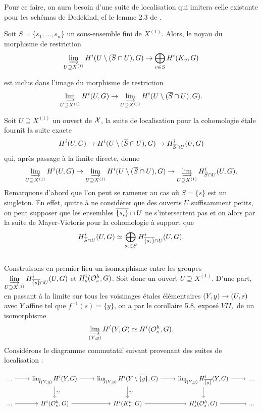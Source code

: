 \documentclass[11pt]{article}
\begin{document}
Pour ce faire, on aura besoin d'une suite de localisation qui imitera celle existante pour les schémas de Dedekind, cf le lemme 2.3 de \cite{HarSza}.

\lemme\label{lemlocalisation} Soit $S=\{s_1,...,s_n\}$ un sous-ensemble fini de $X^{(1)}$. Alors, le noyau du morphisme de restriction
$$
\varinjlim_{U \supseteq X^{(1)}} H^i(U\setminus (\overline{S} \cap U),G) \rightarrow \bigoplus_{v \in S} H^i(K_v,G)
$$

est inclus dans l'image du morphisme de restriction
$$
\varinjlim_{U \supseteq X^{(1)}} H^i(U,G) \rightarrow \varinjlim_{U \supseteq X^{(1)}} H^i(U\setminus (\overline{S} \cap U),G).
$$

\proof Soit $U \supseteq X^{(1)}$ un ouvert de $\mathcal{X}$, la suite de localisation pour la cohomologie étale fournit la suite exacte
$$
H^i(U,G) \rightarrow H^i(U\setminus (\overline{S} \cap U),G) \rightarrow H^i_{\overline{S}\cap U}(U,G)
$$
qui, après passage à la limite directe, donne
$$
\varinjlim_{U \supseteq X^{(1)}} H^i(U,G) \rightarrow \varinjlim_{U \supseteq X^{(1)}} H^i(U\setminus (\overline{S} \cap U),G) \rightarrow \varinjlim_{U \supseteq X^{(1)}} H^i_{\overline{S}\cap U}(U,G).
$$
Remarquons d'abord que l'on peut se ramener au cas où $S=\{s\}$ est un singleton. En effet, quitte à ne considérer que des ouverts $U$ suffisamment petits, on peut supposer que les ensembles $\overline{\{s_i\}} \cap U$ ne s'intersectent pas et on alors par la suite de Mayer-Vietoris pour la cohomologie à support que 
$$
H^i_{\overline{S}\cap U}(U,G) \simeq \bigoplus_{s_i \in S} H^i_{\overline{\{s_i\}}\cap U}(U,G).
$$
\\
Construisons en premier lieu un isomorphisme entre les groupes $ \displaystyle \varinjlim_{U \supseteq X^{(1)}}H^i_{\overline{\{s\}}\cap U}(U,G)$ et $H^i_s(\mathcal{O}_s^h,G)$.
Soit donc un ouvert $U \supseteq X^{(1)}$. D'une part, en passant à la limite sur tous les voisinages étales élémentaires $(Y,y) \rightarrow (U,s)$ avec $Y$ affine tel que $f^{-1}(s)=\{y\}$, on a par le corollaire 5.8, exposé $\textit{VII},$ de \cite{SGA4} un isomorphisme
$$
\varinjlim_{(Y,y)}H^i(Y,G) \simeq H^i(\mathcal{O}_s^h,G).
$$
 Considérons le diagramme commutatif suivant provenant des suites de localisation :

\[\begin{tikzcd}
 ...&\drl_{(Y,y)} H^i(Y,G)  &\drl_{(Y,y)} H^i(Y \setminus \ol{\{y\}}, G) &\drl_{(Y,y)} H^i_{\ol{\{y\}}}(Y,G) & ....\\
... & H^i(\CO_s^h,G) & H^i(K_s^h,G) & H^i_s(\CO_s^h,G) & ...\\
     \arrow[from=1-1, to=1-2]
     \arrow[from=1-2, to=1-3]
     \arrow[from=1-3, to=1-4]
     \arrow[from=1-4, to=1-5]
     \arrow[from=2-1, to=2-2]
     \arrow[from=2-2, to=2-3]
     \arrow[from=2-3, to=2-4]
     \arrow[from=2-4, to=2-5]
     \arrow[from=1-2, to=2-2, "\simeq"]
     \arrow[from=1-3, to=2-3, "\simeq"]
     \arrow[from=1-4, to=2-4]
\end{tikzcd}\]
\end{document}
